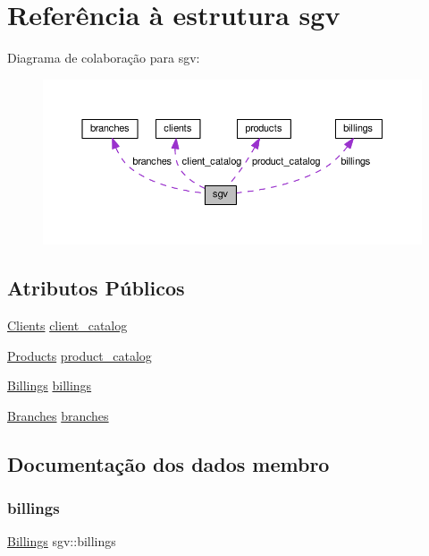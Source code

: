 \hypertarget{structsgv}{}\section{Referência à estrutura sgv}
\label{structsgv}


Diagrama de colaboração para sgv\+:
\nopagebreak
\begin{figure}[H]
\begin{center}
\leavevmode
\includegraphics[width=350pt]{structsgv__coll__graph}
\end{center}
\end{figure}
\subsection*{Atributos Públicos}
\begin{DoxyCompactItemize}
\item 
\hyperlink{structclients}{Clients} \hyperlink{structsgv_ac28c11a53701c92a0133867d5790d3ab}{client\+\_\+catalog}
\item 
\hyperlink{structproducts}{Products} \hyperlink{structsgv_a614c60f5fb7c10e8e32928bba3b86277}{product\+\_\+catalog}
\item 
\hyperlink{structbillings}{Billings} \hyperlink{structsgv_a6fccce3e0a304bd96c165dac09f7a9ad}{billings}
\item 
\hyperlink{structbranches}{Branches} \hyperlink{structsgv_a655e9a2713e0baa6cfbaca8b84128616}{branches}
\end{DoxyCompactItemize}


\subsection{Documentação dos dados membro}
\mbox{\label{structsgv_a6fccce3e0a304bd96c165dac09f7a9ad}} 
\subsubsection{\texorpdfstring{billings}{billings}}
{\footnotesize\ttfamily \hyperlink{structbillings}{Billings} sgv\+::billings}

